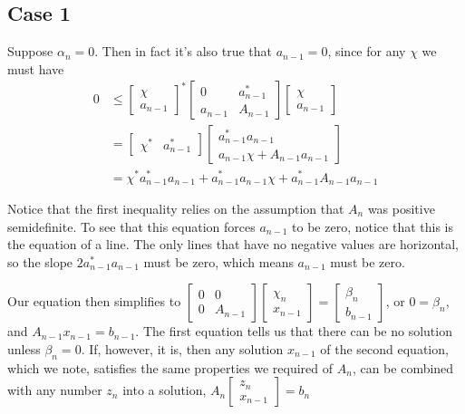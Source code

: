\documentclass{article}
\begin{document}
\subsection{Case 1}
Suppose $\alpha_n=0$. Then in fact it's also true that $a_{n-1}=0$, since for
any $\chi$ we must have
\begin{align*}
  0 &\leq \begin{bmatrix}\chi\\a_{n-1}\end{bmatrix}^*\begin{bmatrix}0 & a_{n-1}^*
  \\ a_{n-1} & A_{n-1}\end{bmatrix}\begin{bmatrix}\chi\\a_{n - 1}\end{bmatrix} \\&= \begin{bmatrix}\chi^* & a_{n-1}^*\end{bmatrix} \begin{bmatrix}a_{n-1}^*a_{n-1}\\a_{n-1}\chi+A_{n-1}a_{n-1}\end{bmatrix}
\\&= \chi^*a_{n-1}^*a_{n-1} + a_{n-1}^*a_{n-1}\chi + a_{n-1}^*A_{n-1}a_{n-1}
\end{align*}

Notice that the first inequality relies on the assumption that $A_n$ was
positive semidefinite. To see that this equation forces $a_{n-1}$ to be zero,
notice that this is the equation of a line. The only lines that have no negative
values are horizontal, so the slope $2a_{n-1}^*a_{n-1}$ must be zero, which means $a_{n-1}$ must
be zero.

Our equation then simplifies to 
$
\begin{bmatrix}0 & 0 \\ 0 & A_{n-1}\end{bmatrix}\begin{bmatrix}\chi_n\\x_{n-1}\end{bmatrix} =\begin{bmatrix}\beta_n\\b_{n-1}\end{bmatrix}
$, or $0=\beta_n$, and
$A_{n-1}x_{n-1}=b_{n-1} $. The first equation tells us that there can be no solution unless
$\beta_n=0$. If, however, it is, then any solution $x_{n-1}$ of the
second equation, which we note, satisfies the same properties we required of 
$A_n$, can be combined with any number $z_n$ into a solution,
$A_n\begin{bmatrix}z_n\\x_{n-1}\end{bmatrix} = b_n$
\end{document}
